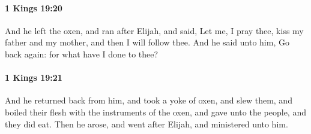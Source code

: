 		\paragraph{1 Kings 19:20} %
			\label{1KINGS-19-20}

			And he left the oxen, and ran after Elijah, and said, Let me, I pray thee, kiss my father and my mother, and then I will follow thee. And he said unto him, Go back again: for what have I done to thee?


		\paragraph{1 Kings 19:21} %
			\label{1KINGS-19-21}

			And he returned back from him, and took a yoke of oxen, and slew them, and boiled their flesh with the instruments of the oxen, and gave unto the people, and they did eat. Then he arose, and went after Elijah, and ministered unto him.

